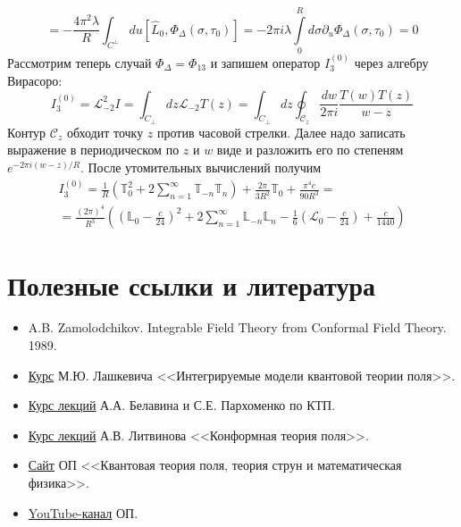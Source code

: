 \documentclass[12pt]{article}
\theoremstyle{definition}
\begin{document}
\begin{equation}
    [I_1^{(0)},H_\Delta^+]=-\frac{4\pi^2\lambda}{R}\int_{C^\perp}du[\widehat{L}_0,\Phi_\Delta(\sigma,\tau_0)]=-2\pi i\lambda\int\limits_0^Rd\sigma\partial_u\Phi_\Delta(\sigma,\tau_0)=0
\end{equation}
Рассмотрим теперь случай $\Phi_\Delta = \Phi_{13}$ и запишем оператор $I^{(0)}_3$ через алгебру Вирасоро:
\begin{equation}
    I_3^{(0)}=\mathcal{L}_{-2}^2I=\int_{C_\perp}dz\mathcal{L}_{-2}T(z)=\int_{C_\perp}dz\oint_{\mathcal{C}_z}\frac{dw}{2\pi i}\frac{T(w)T(z)}{w-z}
\end{equation}
Контур $\mathcal{C}_z$ обходит точку $z$ против часовой стрелки. Далее надо записать выражение в периодическом по $z$ и $w$ виде и разложить его по степеням $e^{-2\pi i(w-z)/R}$. После утомительных вычислений получим
\begin{multline}
    I_3^{(0)}=\frac{1}{R}\left(\mathbb{T}_0^2+2\sum\limits_{n=1}^\infty\mathbb{T}_{-n}\mathbb{T}_n\right)+\frac{2\pi}{3R^2}\mathbb{T}_0+\frac{\pi^4c}{90R^3}=\\=\frac{(2\pi)^4}{R^3}\left(\left(\mathbb{L}_0-\frac{c}{24}\right)^2+2\sum\limits_{n=1}^\infty\mathbb{L}_{-n}\mathbb{L}_n-\frac{1}{6}\left(\mathcal{L}_0-\frac{c}{24}\right)+\frac{c}{1440}\right)
\end{multline}
\newpage
\section{Полезные ссылки и литература}
\begin{itemize}
    \item A.B. Zamolodchikov. Integrable Field Theory from Conformal Field Theory. 1989.
    \item \href{http://lashkevi.itp.ac.ru/lectures/imqft/}{Курс} М.Ю. Лашкевича <<Интегрируемые модели квантовой теории поля>>.
    \item \href{http://strings.itp.ac.ru/wp/?page_id=939}{Курс лекций} А.А. Белавина и С.Е. Пархоменко по КТП.
    \item \href{http://strings.itp.ac.ru/Lecture-Notes/CFT2022.pdf}{Курс лекций} А.В. Литвинова <<Конформная теория поля>>.
    \item \href{http://strings.itp.ac.ru/wp/}{Сайт} ОП <<Квантовая теория поля, теория струн и математическая физика>>.
    \item \href{https://www.youtube.com/@QFTStringMath}{YouTube-канал} ОП.
\end{itemize}
\end{document}
